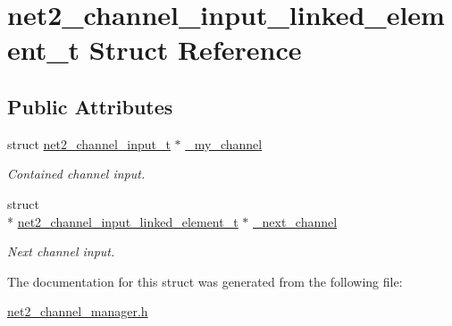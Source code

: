 \hypertarget{structnet2__channel__input__linked__element__t}{\section{net2\-\_\-channel\-\_\-input\-\_\-linked\-\_\-element\-\_\-t Struct Reference}
\label{structnet2__channel__input__linked__element__t}
}
\subsection*{Public Attributes}
\begin{DoxyCompactItemize}
\item 
\hypertarget{structnet2__channel__input__linked__element__t_ad736ec541c37469b5e0e92f1bacc2a62}{struct \hyperlink{structnet2__channel__input__t}{net2\-\_\-channel\-\_\-input\-\_\-t} $\ast$ \hyperlink{structnet2__channel__input__linked__element__t_ad736ec541c37469b5e0e92f1bacc2a62}{\-\_\-my\-\_\-channel}}\label{structnet2__channel__input__linked__element__t_ad736ec541c37469b5e0e92f1bacc2a62}

\begin{DoxyCompactList}\small\item\em Contained channel input. \end{DoxyCompactList}\item 
\hypertarget{structnet2__channel__input__linked__element__t_a1b40af29290880f2edb70e6371ce0a50}{struct \\*
\hyperlink{structnet2__channel__input__linked__element__t}{net2\-\_\-channel\-\_\-input\-\_\-linked\-\_\-element\-\_\-t} $\ast$ \hyperlink{structnet2__channel__input__linked__element__t_a1b40af29290880f2edb70e6371ce0a50}{\-\_\-next\-\_\-channel}}\label{structnet2__channel__input__linked__element__t_a1b40af29290880f2edb70e6371ce0a50}

\begin{DoxyCompactList}\small\item\em Next channel input. \end{DoxyCompactList}\end{DoxyCompactItemize}


The documentation for this struct was generated from the following file\-:\begin{DoxyCompactItemize}
\item 
\hyperlink{net2__channel__manager_8h}{net2\-\_\-channel\-\_\-manager.\-h}\end{DoxyCompactItemize}
